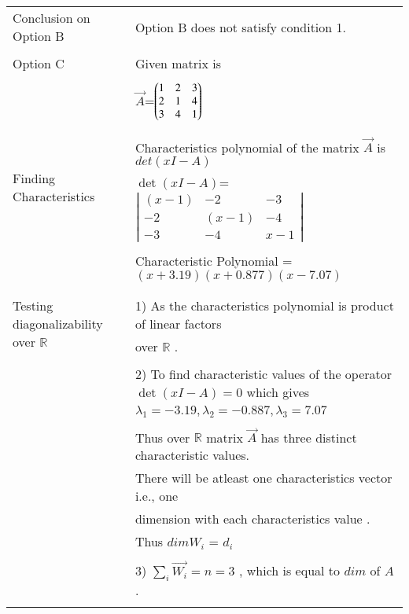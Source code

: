 \documentclass[journal,12pt]{IEEEtran}
\begin{document}
\begin{longtable}{|l|l|}
&\\
\hline
\multirow{3}{*}{Conclusion on Option B} & \\
& Option B does not satisfy condition 1. \\
&\\
\hline \hline
\multirow{3}{*}{Option C} & \\
& Given matrix is  \\
&\\
& $\vec{A}$=$\begin{pmatrix}1&2&3\\2&1&4\\3&4&1\end{pmatrix}$\\
&\\
\hline
\multirow{3}{*}{Finding Characteristics} & \\
&
Characteristics polynomial of the matrix $\vec{A}$ is $det(xI-A)$\\ 
polynomial
& $\det(xI-A)$= $\left|
                \begin{array}{ccc}
                (x-1) & -2 & -3\\
                -2 & (x-1) & -4\\
                -3 & -4 & x-1
                \end{array} \right|$  \\
&\\
& Characteristic Polynomial = $(x+3.19)(x+0.877)(x-7.07)$\\
&\\
\hline
\multirow{3}{*}{Testing diagonalizability over $\mathbb{R}$} & \\
& 1) As the characteristics  polynomial is product of linear factors\\
&over $\mathbb{R}$ .\\
&\\
&2) To find characteristic values of the operator $\det(xI-A) = 0$ which gives  \\
& $\lambda_1= -3.19 , \lambda_2= -0.887, \lambda_3= 7.07$\\
&\\
& Thus over $\mathbb{R}$ matrix $\vec{A}$ has three distinct characteristic values.\\
&There will be atleast one characteristics vector i.e., one\\ & dimension with each characteristics value .\\
&Thus $dim W_i$ = $d_i$\\
&\\
&3) $\sum_{i} \vec{W_i} = n = 3$ , which is equal to $dim$ of $A$.\\ 
&\\

\end{longtable}
\end{document}
